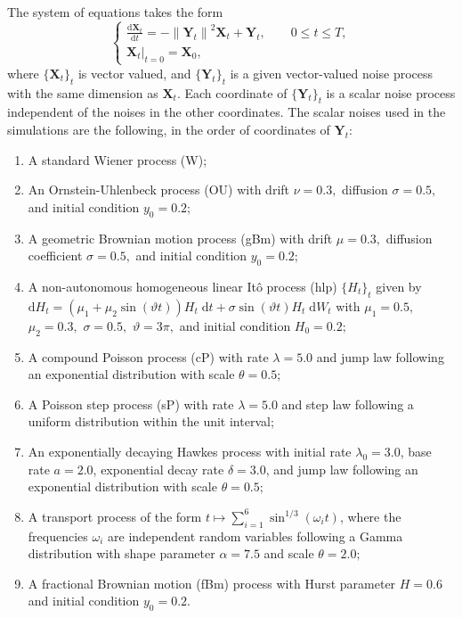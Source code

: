 \documentclass[reqno,12pt]{amsart}
\theoremstyle{plain} %
\theoremstyle{definition} %
\begin{document}
The system of equations takes the form
\begin{equation}
    \label{allnoisesRODEsystem}
    \begin{cases}
        \displaystyle \frac{\mathrm{d}\mathbf{X}_t}{\mathrm{d} t} = - \left\|\mathbf{Y}_t\right\|^2 \mathbf{X}_t + \mathbf{Y}_t, \qquad 0 \leq t \leq T, \\
        \left. \mathbf{X}_t \right|_{t = 0} = \mathbf{X}_0,
    \end{cases}
\end{equation}
where $\{\mathbf{X}_t\}_t$ is vector valued, and $\{\mathbf{Y}_t\}_t$ is a given vector-valued noise process with the same dimension as $\mathbf{X}_t$. Each coordinate of $\{\mathbf{Y}_t\}_t$ is a scalar noise process independent of the noises in the other coordinates. The scalar noises used in the simulations are the following, in the order of coordinates of $\mathbf{Y}_t$:
\begin{enumerate}
    \item A standard Wiener process (W);
    \item An Ornstein-Uhlenbeck process (OU) with drift $\nu = 0.3,$ diffusion $\sigma = 0.5,$ and initial condition $y_0 = 0.2$;
    \item A geometric Brownian motion process (gBm) with drift $\mu = 0.3,$ diffusion coefficient $\sigma = 0.5,$ and initial condition $y_0 = 0.2$;
    \item A non-autonomous homogeneous linear It\^o process (hlp) $\{H_t\}_t$ given by $\mathrm{d}H_t = (\mu_1 + \mu_2\sin(\vartheta t))H_t\;\mathrm{d}t + \sigma\sin(\vartheta t)H_t\;\mathrm{d}W_t$ with $\mu_1 = 0.5,$ $\mu_2 = 0.3,$ $\sigma = 0.5,$ $\vartheta=3\pi,$ and initial condition $H_0 = 0.2;$
    \item A compound Poisson process (cP) with rate $\lambda = 5.0$ and jump law following an exponential distribution with scale $\theta = 0.5;$
    \item A Poisson step process (sP) with rate $\lambda = 5.0$ and step law following a uniform distribution within the unit interval;
    \item An exponentially decaying Hawkes process with initial rate $\lambda_0 = 3.0$, base rate $a = 2.0$, exponential decay rate $\delta = 3.0$, and jump law following an exponential distribution with scale $\theta = 0.5;$
    \item A transport process of the form $t \mapsto \sum_{i=1}^{6} \sin^{1/3}(\omega_i t)$, where the frequencies $\omega_i$ are independent random variables following a Gamma distribution with shape parameter $\alpha = 7.5$ and scale $\theta = 2.0;$
    \item A fractional Brownian motion (fBm) process with Hurst parameter $H=0.6$ and initial condition $y_0 = 0.2$.
\end{enumerate}
\end{document}

